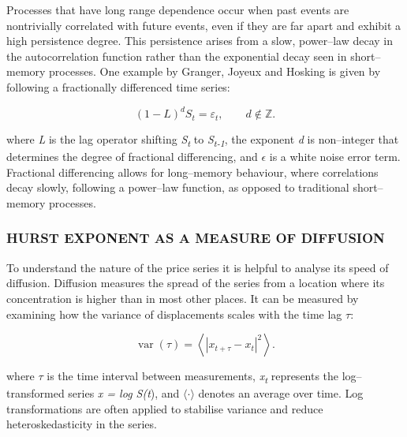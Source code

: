 \documentclass[12pt,a4paper]{report}
\numberwithin{equation}{section}
\begin{document}
Processes that have long range dependence occur when past events are
nontrivially correlated with future events, even if they are far apart
and exhibit a high persistence degree. This persistence arises from a
slow, power--law decay in the autocorrelation function rather than the
exponential decay seen in short--memory processes. One example by
Granger, Joyeux and Hosking \cite{robinson2003time_17} is given by following a
fractionally differenced time series:

\begin{equation}
(1 - L)^{d} S_{t} = \varepsilon_{t}, \qquad d \notin \mathbb{Z}.
\end{equation}


where \emph{L} is the lag operator shifting \emph{S\textsubscript{t}} to
\emph{S\textsubscript{t-1}}, the exponent \emph{d} is non--integer that
determines the degree of fractional differencing, and $\epsilon$ is a white noise
error term. Fractional differencing allows for long--memory behaviour,
where correlations decay slowly, following a power--law function, as
opposed to traditional short--memory processes.

\hypertarget{hurst--exponent--as--a--measure--of--diffusion}{%
\subsubsection{HURST EXPONENT AS A MEASURE OF
DIFFUSION}\label{hurst--exponent--as--a--measure--of--diffusion}}

To understand the nature of the price series it is helpful to analyse
its speed of diffusion. Diffusion measures the spread of the series from
a location where its concentration is higher than in most other places.
It can be measured by examining how the variance of displacements scales
with the time lag $\tau$:

\begin{equation}
\operatorname{var}(\tau)=\left\langle \left|x_{t+\tau}-x_t\right|^2 \right\rangle .
\label{eq:var-tau}
\end{equation}


where $\tau$ is the time interval between measurements,
\emph{x\textsubscript{t}} represents the log--transformed series \emph{x
= log S(t}), and $\langle$$\cdot$$\rangle$ denotes an average over time. Log transformations
are often applied to stabilise variance and reduce heteroskedasticity in
the series.
\end{document}
